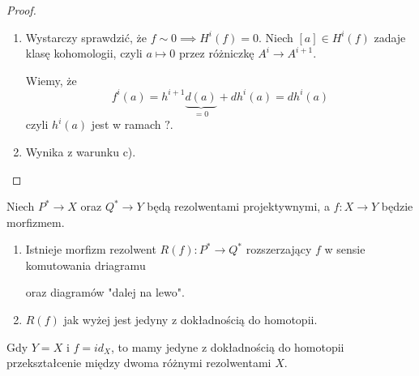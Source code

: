 \begin{proof}
\begin{enumerate}[label=(\alph*)]
    \item Wystarczy sprawdzić, że $f\sim 0\implies H^i(f)=0$. Niech $[a]\in H^i(f)$ zadaje klasę kohomologii, czyli $a\mapsto 0$ przez różniczkę $A^i\to A^{i+1}$.
      \begin{center}
      \end{center}
      Wiemy, że 
      $$f^i(a)=h^{i+1}\underbrace{d(a)}_{=0}+dh^i(a)=dh^i(a)$$
      czyli $h^i(a)$ jest w ramach $?$.
    \item Wynika z warunku c).
  \end{enumerate}
\end{proof}

\begin{fact}
  Niech $P^*\to X$ oraz $Q^*\to Y$ będą rezolwentami projektywnymi, a $f:X\to Y$ będzie morfizmem.
  \begin{enumerate}
    \item Istnieje morfizm rezolwent $R(f):P^*\to Q^*$ rozszerzający $f$ w sensie komutowania driagramu
      \begin{center}\end{center}
      oraz diagramów "dalej na lewo".
    \item $R(f)$ jak wyżej jest jedyny z dokładnością do homotopii.
  \end{enumerate}
\end{fact}

\begin{conclusion}
  Gdy $Y=X$ i $f=id_X$, to mamy jedyne z dokładnością do homotopii przekształcenie między dwoma różnymi rezolwentami $X$.
\end{conclusion}


